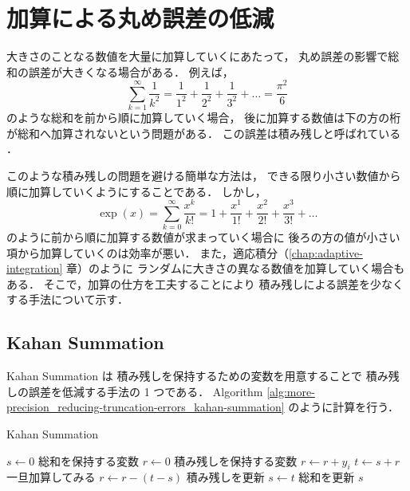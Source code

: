 %

\chapter{加算による丸め誤差の低減}

大きさのことなる数値を大量に加算していくにあたって，
丸め誤差の影響で総和の誤差が大きくなる場合がある．
例えば，
\begin{equation}
    \sum_{k = 1}^{\infty} \frac{1}{k^2}
    = \frac{1}{1^2} + \frac{1}{2^2} + \frac{1}{3^2} + \ldots
    = \frac{\pi^2}{6}
\end{equation}
のような総和を前から順に加算していく場合，
後に加算する数値は下の方の桁が総和へ加算されないという問題がある．
この誤差は積み残しと呼ばれている \cite[4.4 節]{Togawa2007}．

このような積み残しの問題を避ける簡単な方法は，
できる限り小さい数値から順に加算していくようにすることである．
しかし，
\begin{equation}
    \exp(x) = \sum_{k = 0}^{\infty} \frac{x^k}{k!}
    = 1 + \frac{x^1}{1!} + \frac{x^2}{2!} + \frac{x^3}{3!} + \ldots
\end{equation}
のように前から順に加算する数値が求まっていく場合に
後ろの方の値が小さい項から加算していくのは効率が悪い．
また，適応積分（\ref{chap:adaptive-integration} 章）のように
ランダムに大きさの異なる数値を加算していく場合もある．
そこで，加算の仕方を工夫することにより
積み残しによる誤差を少なくする手法について示す．

\section{Kahan Summation}

Kahan Summation \cite{Kahan1965} は
積み残しを保持するための変数を用意することで
積み残しの誤差を低減する手法の 1 つである．
Algorithm \ref{alg:more-precision_reducing-truncation-errors_kahan-summation}
のように計算を行う．

\begin{algorithm}[tbp]
    \caption{Kahan Summation \cite{Kahan1965}}
    \label{alg:more-precision_reducing-truncation-errors_kahan-summation}
    \begin{algorithmic}
        \State $s \gets 0$
        \Comment 総和を保持する変数
        \State $r \gets 0$
        \Comment 積み残しを保持する変数
        \State $r \gets r + y_i$
        \State $t \gets s + r$
        \Comment 一旦加算してみる
        \State $r \gets r - (t - s)$
        \Comment 積み残しを更新
        \State $s \gets t$
        \Comment 総和を更新
        \EndFor
        \State \Return $s$
        \EndProcedure
    \end{algorithmic}
\end{algorithm}

